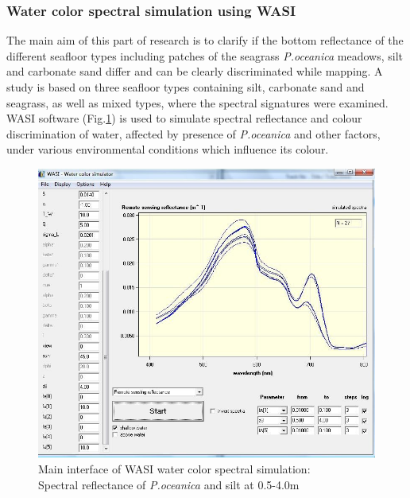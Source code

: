 \documentclass[11pt]{article}
\begin{document}
\subsubsection{Water color spectral simulation using WASI}
The main aim of this part of research is to clarify if the bottom reflectance of the different seafloor types including patches of
the seagrass \textit{P.oceanica} meadows, silt and carbonate sand differ and can be clearly discriminated while mapping. A study is
based on three seafloor types containing silt, carbonate sand and seagrass, as well as mixed
types, where the spectral signatures were examined. WASI software (Fig.\ref{fig:4.7}) is used to simulate
spectral reflectance and colour discrimination of water, affected by presence of \textit{P.oceanica} and other factors, under various
environmental conditions which influence its colour.

\begin{figure}[h]
	\centering
	\includegraphics[scale=0.30]{Fig-30.jpg}
	\caption{Main interface of WASI water color spectral simulation: \\ Spectral reflectance of \textit{P.oceanica} and silt at 0.5-4.0m}
	\label{fig:4.7}
\end{figure}
\end{document}
